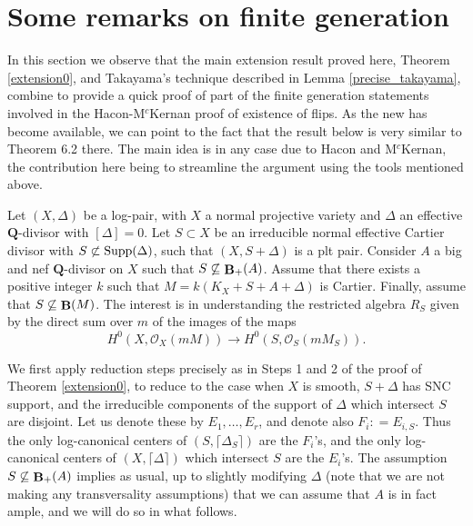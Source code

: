 \documentclass[11pt]{amsart}
\theoremstyle{plain}
\theoremstyle{definition}
\newcommand{\QQ}{\mathbf{Q}}
\newcommand{\OO}{\mathcal  {O}}
\DeclareMathOperator{\BB}{{\bf B}}
\begin{document}
\section{Some remarks on finite generation}

In this section we observe that the main extension result proved here, Theorem \ref{extension0}, and Takayama's technique described in Lemma \ref{precise_takayama}, combine to provide a quick proof 
of part of the finite generation statements involved in the Hacon-M$^c$Kernan  proof of existence of flips. As the new \cite{hm3} has become available, we can point to the fact that the result below is very similar to Theorem 6.2 there. The main idea is in any case due to Hacon and M$^c$Kernan, the contribution here being to streamline the argument using the tools mentioned above.  

Let $(X, \Delta)$ be a log-pair, with $X$ a normal projective variety and $\Delta$ an effective $\QQ$-divisor with $[\Delta] = 0$. Let $S \subset X$ be an irreducible normal effective Cartier divisor with $S \not\subset {\rm Supp}(\Delta)$, such that $(X, S +  \Delta)$ is a plt pair.
Consider $A$ a big and nef $\QQ$-divisor on $X$ such that $S \not\subseteq \BB_{+} (A)$. Assume that there exists a positive integer
$k$ such that $M = k(K_X + S + A + \Delta)$ is Cartier. Finally, assume that $S\not\subseteq \BB(M)$.
The interest is in understanding the restricted algebra $R_S$ given by the direct sum over $m$ of the images of the maps 
$$H^0 (X, \OO_X (mM)) \longrightarrow H^0 (S, \OO_S (mM_S)).$$ 

We first apply reduction steps precisely as in Steps 1 and 2 of the proof of Theorem
\ref{extension0}, to reduce to the case when $X$ is smooth, $S + \Delta$ has SNC support, and the irreducible components of the support of $\Delta$ 
which intersect $S$ are disjoint. Let us denote these by $E_1,\ldots, E_r$, and denote also $F_i : = E_{i, S}$. Thus the only log-canonical centers of $(S, \lceil \Delta_S\rceil)$ 
are the $F_i$'s, and the only log-canonical centers of $(X, \lceil \Delta \rceil)$ which 
intersect $S$ are the $E_i$'s. The assumption $S \not \subseteq 
\BB_{+} (A)$ implies as usual, up to slightly modifying $\Delta$ (note that we are not making any transversality assumptions) that we can assume that $A$ is in fact ample, and we will do so in what follows.
\end{document}
